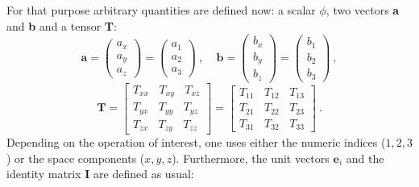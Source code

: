 	For that purpose arbitrary quantities are defined now: a scalar $\phi$,
    two vectors \textbf{a} and \textbf{b} and a tensor \textbf{T}:
%
%
\begin{equation*}
  \textbf{a}
=
  \left(
  \begin{matrix}
    a_x \\ a_y \\ a_z
  \end{matrix}
  \right)
=
  \left(
  \begin{matrix}
    a_1 \\ a_2 \\ a_3
  \end{matrix}
  \right)
  ~,~~~~~
  \textbf{b}
=
  \left(
  \begin{matrix}
    b_x \\ b_y \\ b_z
  \end{matrix}
  \right)
=
  \left(
  \begin{matrix}
    b_1 \\ b_2 \\ b_3
  \end{matrix}
  \right)
  ~,
\end{equation*}
%
%
\begin{equation*}
  \textbf{T}
=
  \left[
  \begin{matrix}
   T_{xx} ~ ~ ~ ~ T_{xy} ~ ~ ~ ~ T_{xz} \\
   T_{yx} ~ ~ ~ ~ T_{yy} ~ ~ ~ ~ T_{yz} \\
   T_{zx} ~ ~ ~ ~ T_{zy} ~ ~ ~ ~ T_{zz}
  \end{matrix}
  \right]
=
  \left[
  \begin{matrix}
   T_{11} ~ ~ ~ ~ T_{12} ~ ~ ~ ~ T_{13} \\
   T_{21} ~ ~ ~ ~ T_{22} ~ ~ ~ ~ T_{23} \\
   T_{31} ~ ~ ~ ~ T_{32} ~ ~ ~ ~ T_{33}
  \end{matrix}
  \right] ~.
\end{equation*}
%
%
	Depending on the operation of interest, one uses either the numeric
    indices ($1, 2, 3$) or the space components ($x, y, z$). Furthermore,
    the unit vectors $\textbf{e}_i$ and the identity matrix $\textbf{I}$
    are defined as usual:
%
%
